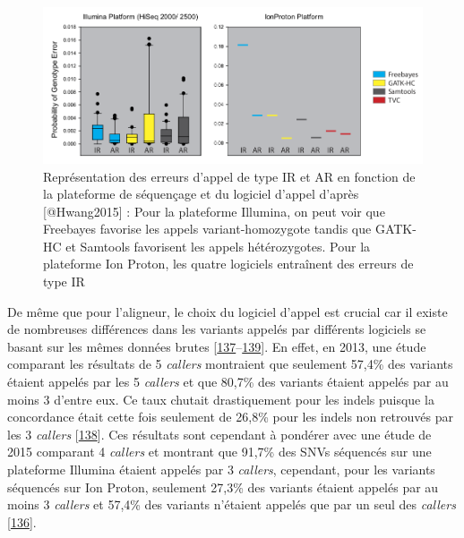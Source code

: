 \documentclass[12pt,twoside]{reedthesis}
\theoremstyle{definition}
\theoremstyle{definition}
\theoremstyle{remark}
\begin{document}
  \begin{figure}
  
  {\centering \includegraphics[scale=.37]{figure/snp_error_type} 
  
  }
  
  \caption[Représentation des erreurs d'appel de type IR et AR en fonction de la plateforme de séquençage et du logiciel d'appel]{Représentation des erreurs d'appel de type IR et AR en fonction de la plateforme de séquençage et du logiciel d'appel d'après [@Hwang2015] : Pour la plateforme Illumina, on peut voir que Freebayes favorise les appels variant-homozygote tandis que GATK-HC et Samtools favorisent les appels hétérozygotes. Pour la plateforme Ion Proton, les quatre logiciels entraînent des erreurs de type IR}\label{fig:snperror}
  \end{figure}
  
  De même que pour l'aligneur, le choix du logiciel d'appel est crucial
  car il existe de nombreuses différences dans les variants appelés par
  différents logiciels se basant sur les mêmes données brutes
  {[}\protect\hyperlink{ref-Baes2014}{137}--\protect\hyperlink{ref-Rosenfeld2012}{139}{]}.
  En effet, en 2013, une étude comparant les résultats de 5 \emph{callers}
  montraient que seulement 57,4\% des variants étaient appelés par les 5
  \emph{callers} et que 80,7\% des variants étaient appelés par au moins 3
  d'entre eux. Ce taux chutait drastiquement pour les indels puisque la
  concordance était cette fois seulement de 26,8\% pour les indels non
  retrouvés par les 3 \emph{callers}
  {[}\protect\hyperlink{ref-ORawe2013}{138}{]}. Ces résultats sont
  cependant à pondérer avec une étude de 2015 comparant 4 \emph{callers}
  et montrant que 91,7\% des SNVs séquencés sur une plateforme Illumina
  étaient appelés par 3 \emph{callers}, cependant, pour les variants
  séquencés sur Ion Proton, seulement 27,3\% des variants étaient appelés
  par au moins 3 \emph{callers} et 57,4\% des variants n'étaient appelés
  que par un seul des \emph{callers}
  {[}\protect\hyperlink{ref-Hwang2015}{136}{]}.
  
\end{document}
